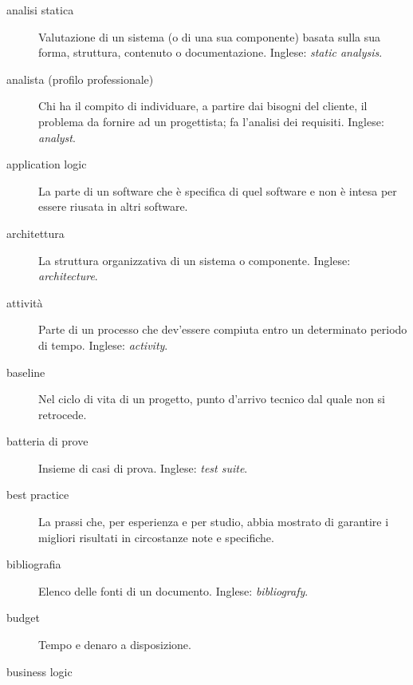 \documentclass[a4paper]{article}
\begin{document}
\begin{description}
	\item[analisi statica] 

			Valutazione di un sistema (o di una sua componente) basata sulla sua forma, struttura, contenuto o documentazione. Inglese: \emph{static analysis}.
			
	\item[analista (profilo professionale)] 

			Chi ha il compito di individuare, a partire dai bisogni del cliente, il problema da fornire ad un progettista; fa l'analisi dei requisiti. Inglese: \emph{analyst}.
			
	\item[application logic] 

			La parte di un software che è specifica di quel software e non è intesa per essere riusata in altri software.
			
	\item[architettura] 

			La struttura organizzativa di un sistema o componente. Inglese: \emph{architecture}.
			
	\item[attività] 

			Parte di un processo che dev'essere compiuta entro un determinato periodo di tempo. Inglese: \emph{activity}.
			
	\item[baseline] 

			Nel ciclo di vita di un progetto, punto d'arrivo tecnico dal quale non si retrocede.
			
	\item[batteria di prove] 

			Insieme di casi di prova. Inglese: \emph{test suite}.
			
	\item[best practice] 

			La prassi che, per esperienza e per studio, abbia mostrato di garantire i migliori risultati in circostanze note e specifiche.
			
	\item[bibliografia] 

			Elenco delle fonti di un documento. Inglese: \emph{bibliografy}.
			
	\item[budget] 

			Tempo e denaro a disposizione.
			
	\item[business logic] 


\end{description}
\end{document}
